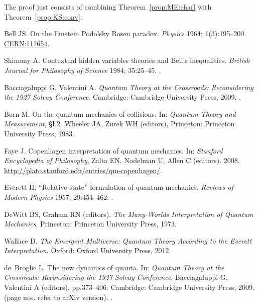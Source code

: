 \documentclass[DIV=calc,paper=a4,fontsize=11pt,twocolumn]{scrartcl} %
\theoremstyle{definition}
\theoremstyle{plain}
\begin{document}
The proof just consists of combining Theorem~\ref{prop:ME:char}
with Theorem~\ref{prop:KS:conv}.
\pagebreak
\balance
\begin{thebibliography}{10}

Bell JS.
\newblock On the Einstein Podolsky Rosen paradox.
\newblock \emph{Physics} 1964; 1(3):195--200.
\newblock \href{https://cds.cern.ch/record/111654}{CERN:111654}.

Shimony A.
\newblock Contextual hidden variables theories and {B}ell's inequalities.
\newblock \emph{British Journal for Philosophy of Science} 1984; 35:25--45.
\newblock \href {http://dx.doi.org/10.1093/bjps/35.1.25}
{}.

Bacciagaluppi G, Valentini A.
\newblock \emph{Quantum Theory at the Crossroads: Reconsidering the 1927 Solvay Conference}.
\newblock Cambridge: Cambridge University Press, 2009.
\newblock \href {http://arxiv.org/abs/quant-ph/0609184}
{}.

Born M.
\newblock On the quantum mechanics of collisions.
\newblock In: \emph{Quantum Theory and Measurement}, \S I.2. Wheeler JA, Zurek WH (editors), Princeton: Princeton University Press, 1983.

Faye J.
\newblock Copenhagen interpretation of quantum mechanics.
\newblock In: \emph{Stanford Encyclopedia of Philosophy}, Zalta EN, Nodelman U, Allen C (editors). 2008.
\newblock \url{http://plato.stanford.edu/entries/qm-copenhagen/}.

Everett H.
\newblock ``Relative state'' formulation of quantum mechanics.
\newblock \emph{Reviews of Modern Physics} 1957; 29:454--462.
\newblock \href {http://dx.doi.org/10.1103/RevModPhys.29.454}
{}.

DeWitt BS, Graham RN (editors).
\newblock \emph{The Many-Worlds Interpretation of Quantum Mechanics}.
\newblock Princeton: Princeton University Press, 1973.

Wallace D.
\newblock \emph{The Emergent Multiverse: Quantum Theory According to the Everett Interpretation}.
\newblock Oxford: Oxford University Press, 2012.

de~Broglie L.
\newblock The new dynamics of quanta.
\newblock In: \emph{Quantum Theory at the Crossroads: Reconsidering the 1927 Solvay Conference}, Bacciagaluppi G, Valentini A (editors), pp.373--406. Cambridge: Cambridge University Press, 2009.
\newblock (page nos. refer to arXiv version).
\newblock \href {http://arxiv.org/abs/quant-ph/0609184}
{}.


\end{thebibliography}
\end{document}
